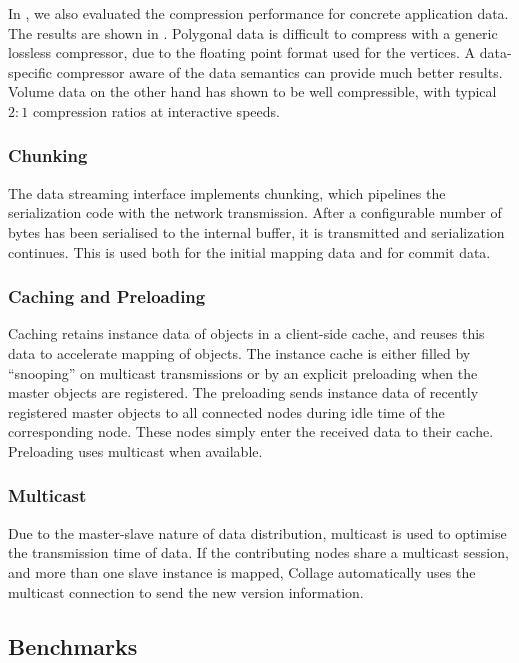 In \cite{ESP:18}, we also evaluated the compression performance for concrete
application data. The results are shown in . Polygonal
data is difficult to compress with a generic lossless compressor, due to the
floating point format used for the vertices. A data-specific compressor aware
of the data semantics can provide much better results. Volume data on the other
hand has shown to be well compressible, with typical $2:1$ compression ratios
at interactive speeds.

\subsubsection{Chunking}

The data streaming interface implements chunking, which pipelines the
serialization code with the network transmission. After a configurable number of
bytes has been serialised to the internal buffer, it is transmitted and
serialization continues. This is used both for the initial mapping data and for
commit data.

\subsubsection{Caching and Preloading}

Caching retains instance data of objects in a client-side cache, and reuses
this data to accelerate mapping of objects. The instance cache is either filled
by ``snooping'' on multicast transmissions or by an explicit preloading when
the master objects are registered. The preloading sends instance data of
recently registered master objects to all connected nodes during idle time of
the corresponding node. These nodes simply enter the received data to their
cache. Preloading uses multicast when available.

\subsubsection{Multicast}

Due to the master-slave nature of data distribution, multicast is used to
optimise the transmission time of data. If the contributing nodes share a
multicast session, and more than one slave instance is mapped, \textsf{Collage}
automatically uses the multicast connection to send the new version
information.

\subsection{Benchmarks}

